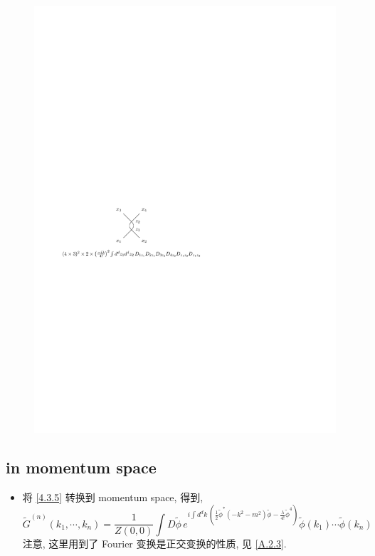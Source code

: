 \begin{itemize}
	\begin{figure}[H]
		\centering
		\includegraphics[scale=1]{figures/collision between particles - another Feynman diagrams.pdf}
	\end{figure}
\end{itemize}

\subsection{in momentum space}
\begin{itemize}
	\item 将 \eqref{4.3.5} 转换到 momentum space, 得到,
	\begin{equation}
		\tilde{G}^{(n)}(k_1, \cdots, k_n) = \frac{1}{Z(0, 0)} \int D\tilde{\phi} \, e^{i \int d^d k \, (\frac{1}{2} \tilde{\phi}^* (- k^2 - m^2) \tilde{\phi} - \frac{\lambda}{4!} \tilde{\phi}^4)} \tilde{\phi}(k_1) \cdots \tilde{\phi}(k_n)
	\end{equation}
	注意, 这里用到了 Fourier 变换是正交变换的性质, 见 \eqref{A.2.3}.
\end{itemize}

